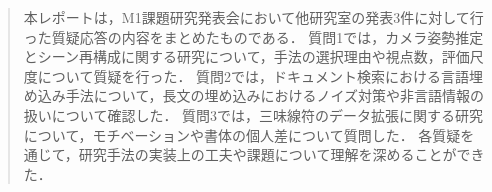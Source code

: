 \begin{abstract}
本レポートは，M1課題研究発表会において他研究室の発表3件に対して行った質疑応答の内容をまとめたものである．
質問1では，カメラ姿勢推定とシーン再構成に関する研究について，手法の選択理由や視点数，評価尺度について質疑を行った．
質問2では，ドキュメント検索における言語埋め込み手法について，長文の埋め込みにおけるノイズ対策や非言語情報の扱いについて確認した．
質問3では，三味線符のデータ拡張に関する研究について，モチベーションや書体の個人差について質問した．
各質疑を通じて，研究手法の実装上の工夫や課題について理解を深めることができた．
\end{abstract}
